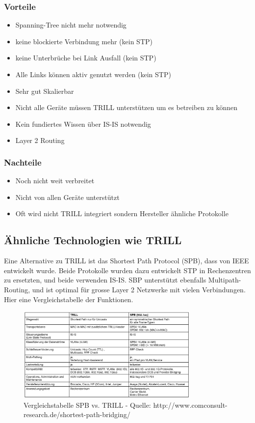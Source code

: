 \documentclass[a4,12pt]{scrartcl}
\begin{document}
\subsubsection{Vorteile}
\begin{itemize}
\item Spanning-Tree nicht mehr notwendig 
\item keine blockierte Verbindung mehr (kein STP) 
\item keine Unterbrüche bei Link Ausfall (kein STP)
\item Alle Links können aktiv genutzt werden (kein STP) 
\item Sehr gut Skalierbar 
\item Nicht alle Geräte müssen TRILL unterstützen um es betreiben zu können
\item Kein fundiertes Wissen über IS-IS notwendig   
\item Layer 2 Routing 
\end{itemize}
\subsubsection{Nachteile}
\begin{itemize}
\item Noch nicht weit verbreitet 
\item Nicht von allen Geräte unterstützt 
\item Oft wird nicht TRILL integriert sondern Hersteller ähnliche Protokolle 
\end{itemize}

\subsection{Ähnliche Technologien wie TRILL} 
Eine Alternative zu TRILL ist das Shortest Path Protocol (SPB), dass von IEEE entwickelt wurde. Beide Protokolle wurden dazu entwickelt STP in Rechenzentren zu ersetzten, und beide verwenden IS-IS. SBP unterstützt ebenfalls Multipath-Routing, und ist optimal für grosse Layer 2 Netzwerke mit vielen Verbindungen. Hier eine Vergleichstabelle der Funktionen. 
\begin{figure} [H]
	\begin{center}
	\includegraphics[width=0.80\textwidth]{./pictures/vergleich_spb-trill.jpg}
	\caption{Vergleichstabelle SPB vs. TRILL - Quelle: http://www.comconsult-research.de/shortest-path-bridging/}
	\label{x}
	\end{center}
\end{figure}
\newpage
\end{document}
